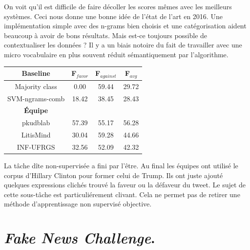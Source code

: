 \documentclass[11pt,a4paper,oldfontcommands]{memoir}
\begin{document}
On voit qu'il est difficile de faire décoller les scores mêmes avec les meilleurs systèmes.
Ceci nous donne une bonne idée de l'état de l'art en 2016.
Une implémentation simple avec des n-grams bien choisis et une catégorisation aident beaucoup à avoir de bons résultats.
Mais est-ce toujours possible de contextualiser les données ? Il y a un biais notoire du fait de  travailler avec une micro vocabulaire en plus souvent réduit sémantiquement par l'algorithme.
\begin{center}
 \begin{tabular}{| c | c | c || c |}
  \hline
  \textbf{Baseline} & \textbf{F$_{favor}$} & \textbf{F$_{against}$} & \textbf{F$_{avg}$} \\
  \hline
  Majority class    & 0.00                 & 59.44                  & 29.72              \\
  SVM-ngrams-comb   & 18.42                & 38.45                  & 28.43              \\
  \hline
  \textbf{Équipe}   &                      &                        &                    \\
  \hline
  pkudblab          & 57.39                & 55.17                  & 56.28              \\
  LitisMind         & 30.04                & 59.28                  & 44.66              \\
  INF-UFRGS         & 32.56                & 52.09                  & 42.32              \\
  \hline
 \end{tabular}
\end{center}

La tâche dîte non-supervisée a fini par l'être.
Au final les équipes ont utilisé le corpus d'Hillary Clinton pour former celui de Trump.
Ils ont juste ajouté quelques expressions clichés trouvé la faveur ou la défaveur du tweet.
Le sujet de cette sous-tâche est particuliérement clivant.
Cela ne permet pas de retirer une méthode d'apprentissage non supervisé objective.


\section{\textit{Fake News Challenge}.}
\end{document}
